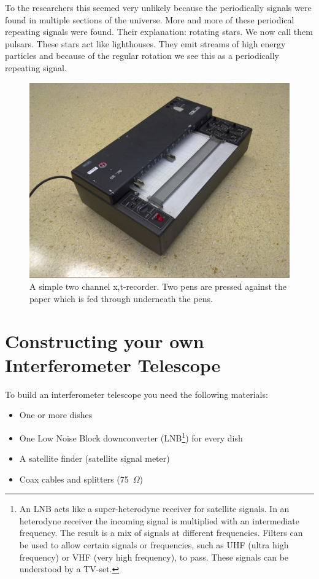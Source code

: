 \documentclass[12pt,a4paper]{article}
\numberwithin{equation}{section}
\numberwithin{figure}{section}
\numberwithin{table}{section}
\begin{document}
To the researchers this seemed very unlikely because the periodically signals were found in multiple sections of the universe. More and more of these periodical repeating signals were found. Their explanation: rotating stars. We now call them pulsars. These stars act like lighthouses. They emit streams of high energy particles and because of the regular rotation we see this as a periodically repeating signal.

\begin{figure}[h]\begin{center}
\includegraphics[scale=0.12]{recorder.jpg}%
\caption{A simple two channel x,t-recorder. Two pens are pressed against the paper which is fed through underneath the pens.}\label{fig:recorder}
\end{center}\end{figure}

\section{Constructing your own Interferometer Telescope}
To build an interferometer telescope you need the following materials:
\begin{itemize}
\item One or more dishes
\item One Low Noise Block downconverter (LNB\footnote{An LNB acts like a super-heterodyne receiver for satellite signals. In an heterodyne receiver the incoming signal is multiplied with an intermediate frequency. The result is a mix of signals at different frequencies. Filters can be used to allow certain signals or frequencies, such as UHF (ultra high frequency) or VHF (very high frequency), to pass. These signals can be understood by a TV-set. }) for every dish
\item A satellite finder (satellite signal meter)
\item Coax cables and splitters (75~$\Omega$)
\end{itemize}
\end{document}
